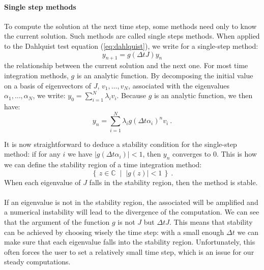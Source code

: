         \paragraph{Single step methods}
        To compute the solution at the next time step, some methods need only to know the current solution.
        Such methods are called single steps methods.
        When applied to the Dahlquist test equation (\ref{eq:dahlquist}), we write for a single-step method:
        \begin{equation}\label{eq:single_step}
          y_{n+1} = g\left(\Delta tJ\right)y_n
        \end{equation}
        the relationship between the current solution and the next one.
        For most time integration methods, $g$ is an analytic function.
        By decomposing the initial value on a basis of eigenvectors of $J$, $v_1, \dots, v_N$, associated with the eigenvalues $\alpha_1, \dots, \alpha_N$, we write: $y_0 = \sum_{i=1}^N \lambda_i v_i$.
        Because $g$ is an analytic function, we then have:
        \begin{equation}
          y_n = \sum_{i=1}^N \lambda_i g\left(\Delta t \alpha_i\right)^n v_i \ .
        \end{equation}

        It is now straightforward to deduce a stability condition for the single-step method: if for any $i$ we have $\left|g\left(\Delta t\alpha_i\right)\right| < 1$, then $y_n$ converges to 0.
        This is how we can define the stability region of a time integration method:
        \begin{equation}
          \left\{ \, z \in \mathbb{C} \; \mid \; \left| g\left(z\right) \right| < 1 \, \right\} \ .
        \end{equation}
        When each eigenvalue of $J$ falls in the stability region, then the method is stable.

        \paragraph{}
        If an eigenvalue is not in the stability region, the associated  will be amplified and a numerical instability will lead to the divergence of the computation.
        We can see that the argument of the function $g$ is not $J$ but $\Delta t J$.
        This means that stability can be achieved by choosing wisely the time step: with a small enough $\Delta t$ we can make sure that each eigenvalue falls into the stability region.
        Unfortunately, this often forces the user to set a relatively small time step, which is an issue for our steady computations.


